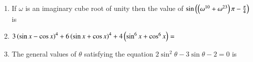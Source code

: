 \documentclass[journal,12pt,twocolumn]{IEEEtran}
\theoremstyle{remark}
\begin{document}
\begin{enumerate}
\begin{enumerate}[label={(\alph*)}]
        \end{enumerate}

    \item If $\omega$ is an imaginary cube root of unity then the value of $\sin{\ensuremath{\left(\left(\omega^{10} + \omega^{23}\right)\pi - \frac{\pi}{4}\right)}}$ is
    
        \hfill{}
        \begin{enumerate}[label={(\alph*)}]
        \end{enumerate}

    \item $3\left(\sin{x} - \cos{x}\right)^4 + 6\left(\sin{x} + \cos{x}\right)^4 + 4\left(\sin^6{x}+\cos^6{x}\right) =$
        
        \hfill{}
        \begin{enumerate}[label={(\alph*)}]
        \end{enumerate}   

    \item The general values of $\theta$ satisfying the equation $2\sin^2{\theta}-3\sin{\theta}-2=0$ is
        
        \hfill{}
        \begin{enumerate}[label={(\alph*)}]
\end{enumerate}
\end{enumerate}
\end{document}
